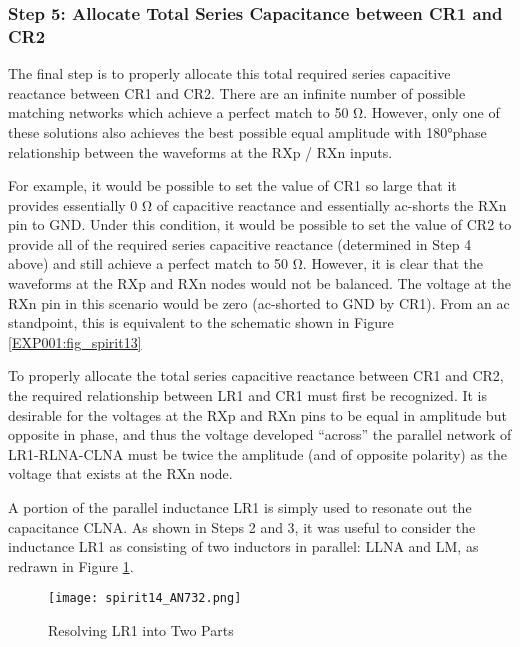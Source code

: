       \subsubsection{Step 5: Allocate Total Series Capacitance between CR1 and CR2}
        The final step is to properly allocate this total required series capacitive reactance 
        between CR1 and CR2. There are an infinite number of possible matching networks which 
        achieve a perfect match to 50 Ω. However, only one of these solutions also achieves the 
        best possible equal amplitude with 180°phase relationship between the waveforms at the RXp 
        / RXn inputs.
        
        For example, it would be possible to set the value of CR1 so large that it provides 
        essentially 0 Ω of capacitive reactance and essentially ac-shorts the RXn pin to GND. Under 
        this condition, it would be possible to set the value of CR2 to provide all of the required 
        series capacitive reactance (determined in Step 4 above) and still achieve a perfect match 
        to 50 Ω. However, it is clear that the waveforms at the RXp and RXn nodes would not be 
        balanced. The voltage at the RXn pin in this scenario would be zero (ac-shorted to GND by 
        CR1). From an ac standpoint, this is equivalent to the schematic shown in Figure 
        \ref{EXP001:fig_spirit13}
        
        To properly allocate the total series capacitive reactance between CR1 and CR2, the 
        required relationship between LR1 and CR1 must first be recognized. It is desirable for the 
        voltages at the RXp and RXn pins to be equal in amplitude but opposite in phase, and thus 
        the voltage developed “across” the parallel network of LR1-RLNA-CLNA must be twice the 
        amplitude (and of opposite polarity) as the voltage that exists at the RXn node.
        
        A portion of the parallel inductance LR1 is simply used to resonate out the capacitance 
        CLNA. As shown in Steps 2 and 3, it was useful to consider the inductance LR1 as consisting 
        of two inductors in parallel: LLNA and LM, as redrawn in Figure \ref{EXP001:fig_spirit14}.
        
        \begin{figure}[ht!] %
          \centering
          \texttt{[image: spirit14\_AN732.png]}
          \caption{Resolving LR1 into Two Parts \cite[s.~9]{AN643SiliconLabs}}
          \label{EXP001:fig_spirit14}
        \end{figure}
        
